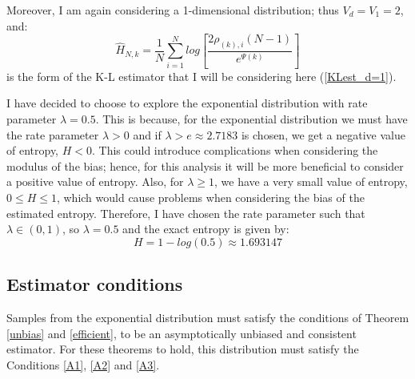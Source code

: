 \documentclass[12pt]{report}
\begin{document}
Moreover, I am again considering a 1-dimensional distribution; thus $V_{d} = V_{1} = 2$, and:
\begin{equation}
\hat{H}_{N, k} =  \frac{1}{N} \sum_{i=1}^{N} log \left[ \frac{2\rho_{(k),i}(N-1)}{e^{\Psi(k)}} \right]\nonumber
\end{equation}
is the form of the K-L estimator that I will be considering here (\ref{KLest_d=1}).

I have decided to choose to explore the exponential distribution with rate parameter $\lambda = 0.5$. This is because, for the exponential distribution we must have the rate parameter $\lambda >0$ and if $\lambda > e \approx 2.7183$ is chosen, we get a negative value of entropy, $H < 0$. This could introduce complications when considering the modulus of the bias; hence, for this analysis it will be more beneficial to consider a positive value of entropy. Also, for $\lambda \geq 1$, we have a very small value of entropy, $0 \leq H \leq 1$, which would cause problems when considering the bias of the estimated entropy. Therefore, I have chosen the rate parameter such that $\lambda \in (0, 1)$, so $\lambda=0.5$ and the exact entropy is given by:
\begin{equation} \label{exponential_exact}
H = 1 - log(0.5) \approx 1.693147
\end{equation}



\subsection{Estimator conditions} \label{E_Conditions}

Samples from the exponential distribution must satisfy the conditions of Theorem \ref{unbias} and \ref{efficient}, to  be an asymptotically unbiased and consistent estimator. For these theorems to hold, this distribution must satisfy the Conditions \ref{A1}, \ref{A2} and \ref{A3}. 
\end{document}

